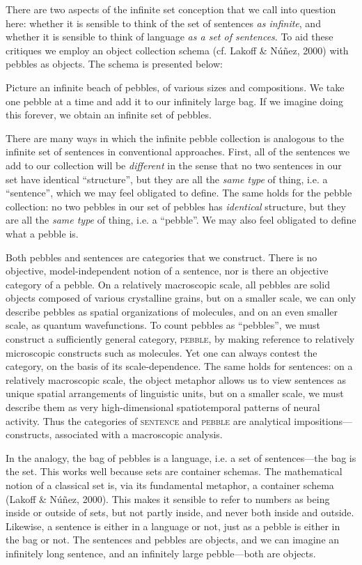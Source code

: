   There are two aspects of the infinite set conception that we call into question here:  whether it is sensible to think of the set of sentences \textit{as infinite}, and  whether it is sensible to think of language \textit{as a set of sentences}. To aid these critiques we employ an object collection schema (cf. Lakoff \& Núñez, 2000) with pebbles as objects. The schema is presented below: 

Picture an infinite beach of pebbles, of various sizes and compositions. We take one pebble at a time and add it to our infinitely large bag. If we imagine doing this forever, we obtain an infinite set of pebbles. 

  There are many ways in which the infinite pebble collection is analogous to the infinite set of sentences in conventional approaches. First, all of the sentences we add to our collection will be \textit{different} in the sense that no two sentences in our set have identical “structure”, but they are all the \textit{same type} of thing, i.e. a “sentence”, which we may feel obligated to define. The same holds for the pebble collection: no two pebbles in our set of pebbles has \textit{identical} structure, but they are all the \textit{same type} of thing, i.e. a “pebble”. We may also feel obligated to define what a pebble is.

  Both pebbles and sentences are categories that we construct. There is no objective, model-independent notion of a sentence, nor is there an objective category of a pebble. On a relatively macroscopic scale, all pebbles are solid objects composed of various crystalline grains, but on a smaller scale, we can only describe pebbles as spatial organizations of molecules, and on an even smaller scale, as quantum wavefunctions. To count pebbles as “pebbles”, we must construct a sufficiently general category, \textsc{pebble}, by making reference to relatively microscopic constructs such as molecules. Yet one can always contest the category, on the basis of its scale-dependence. The same holds for sentences: on a relatively macroscopic scale, the object metaphor allows us to view sentences as unique spatial arrangements of linguistic units, but on a smaller scale, we must describe them as very high-dimensional spatiotemporal patterns of neural activity. Thus the categories of \textsc{sentence} and \textsc{pebble} are analytical impositions—constructs, associated with a macroscopic analysis. 

  In the analogy, the bag of pebbles is a language, i.e. a set of sentences—the bag is the set. This works well because sets are container schemas. The mathematical notion of a classical set is, via its fundamental metaphor, a container schema (Lakoff \& Núñez, 2000). This makes it sensible to refer to numbers as being inside or outside of sets, but not partly inside, and never both inside and outside. Likewise, a sentence is either in a language or not, just as a pebble is either in the bag or not. The sentences and pebbles are objects, and we can imagine an infinitely long sentence, and an infinitely large pebble—both are objects. 

